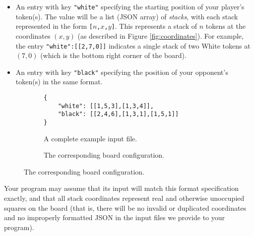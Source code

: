 \documentclass[]{article}
\newcommand{\white}[3] {
  \foreach \x in {0, ..., #3} {
    \draw[fill=white] ({.5+#1},{\x*.1+.5+#2}) circle (0.42) node {#3};
  }
}
\newcommand{\black}[3] {
  \foreach \x in {0, ..., #3} {
    \draw[fill=white!70!black] ({.5+#1},{\x*.1+.5+#2}) circle (0.42) node {#3};
  }
}
\begin{document}


\begin{itemize}
\item
  An entry with key \texttt{"white"} specifying the starting position
  of your player's token(s). The value will be a list (JSON array) of
  \emph{stacks}, with each stack represented in the form \texttt{{[}$n$,$x$,$y${]}}.
  This represents a stack of $n$ tokens at the coordinates $(x, y)$ (as described in
  Figure \ref{fig:coordinates}). For example, the entry \texttt{"white":{[}{[}2,7,0{]}{]}}
  indicates a single stack of two White tokens at $(7, 0)$ (which is the bottom 
  right corner of the board).
\item
  An entry with key \texttt{"black"} specifying the position of your opponent's token(s)
  in the same format.
\end{itemize}

\begin{figure}[ht!]
\centering
\begin{subfigure}[b]{.45\textwidth}
\centering
\begin{verbatim}
{
    "white": [[1,5,3],[1,3,4]],
    "black": [[2,4,6],[1,3,1],[1,5,1]]
}
\end{verbatim}
\vspace{8ex} %
\caption{A complete example input file.}
\end{subfigure}
\begin{subfigure}{.08\textwidth}
\phantom{SP}
\end{subfigure}
\begin{subfigure}[b]{.45\textwidth}
\centering
{}
\caption{The corresponding board configuration.}
\end{subfigure}
\end{figure}

Your program may assume that its input will match this format
specification exactly, and that all stack coordinates represent real
and otherwise unoccupied squares on the board (that is, there will be no
invalid or duplicated coordinates and no improperly formatted JSON in
the input files we provide to your program).
\end{document}
